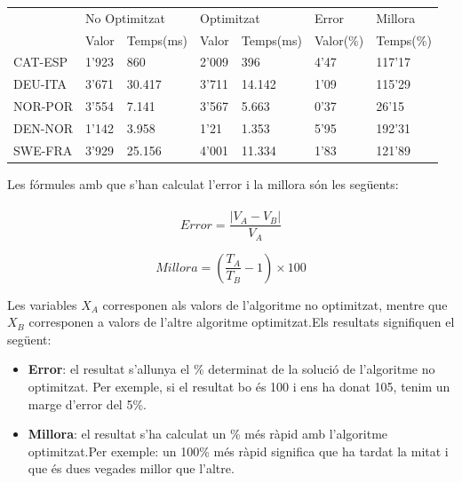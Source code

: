 \documentclass[conference]{IEEEtran}
\begin{document}
\begin{table}[]
\begin{tabular}{|l|ll|ll|l|l|}
\hline
\multirow{2}{*}{} & \multicolumn{2}{l|}{No Optimitzat}     & \multicolumn{2}{l|}{Optimitzat}        & Error     & Millora   \\ \cline{2-7} 
                  & \multicolumn{1}{l|}{Valor} & Temps(ms) & \multicolumn{1}{l|}{Valor} & Temps(ms) & Valor(\%) & Temps(\%) \\ \hline
CAT-ESP           & \multicolumn{1}{l|}{1'923} & 860       & \multicolumn{1}{l|}{2'009} & 396       & 4'47      & 117'17    \\ \hline
DEU-ITA           & \multicolumn{1}{l|}{3'671} & 30.417    & \multicolumn{1}{l|}{3'711} & 14.142    & 1'09      & 115'29    \\ \hline
NOR-POR           & \multicolumn{1}{l|}{3'554} & 7.141     & \multicolumn{1}{l|}{3'567} & 5.663     & 0'37      & 26'15     \\ \hline
DEN-NOR           & \multicolumn{1}{l|}{1'142} & 3.958     & \multicolumn{1}{l|}{1'21}  & 1.353     & 5'95      & 192'31    \\ \hline
SWE-FRA           & \multicolumn{1}{l|}{3'929} & 25.156    & \multicolumn{1}{l|}{4'001} & 11.334    & 1'83      & 121'89    \\ \hline
\end{tabular}
\end{table} 

Les fórmules amb que s'han calculat l'error i la millora són les següents:\\\\
\begin{equation}
Error = \frac{|V_A-V_B|}{V_A}
\label{eq:error}
\end{equation}

\begin{equation}
Millora = (\frac{T_A}{T_B}-1) \times 100
\label{eq:acceleration}
\end{equation}

    Les variables $X_A$ corresponen als valors de l'algoritme no optimitzat, mentre que $X_B$ corresponen a valors de l'altre algoritme optimitzat.Els resultats signifiquen el següent:\\

    \begin{itemize}
        \item \textbf{Error}: el resultat s'allunya el \% determinat de la solució de l'algoritme no optimitzat. Per exemple, si el resultat bo és 100 i ens ha donat 105, tenim un marge d'error del 5\%.

        \item \textbf{Millora}: el resultat s'ha calculat un \% més ràpid amb l'algoritme optimitzat.Per exemple: un 100\% més ràpid significa que ha tardat la mitat i que és dues vegades millor que l'altre.
        
    \end{itemize}
\end{document}
